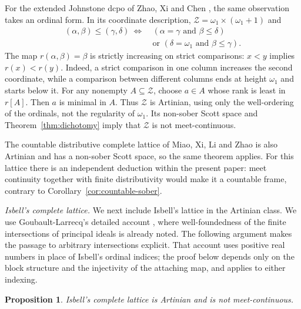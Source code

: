 \documentclass[11pt,reqno]{amsart}
\newtheorem{proposition}[theorem]{Proposition}
\theoremstyle{definition}
\numberwithin{equation}{section}
\begin{document}
For the extended Johnstone dcpo of Zhao, Xi and Chen
\citep{ZhaoXiChen2019}, the same observation takes an ordinal form.
In its coordinate description,
$\mathcal Z=\omega_1\times(\omega_1+1)$ and
\begin{equation}\label{eq:extended-johnstone-order}
\begin{split}
  (\alpha,\beta)\leq(\gamma,\delta)
  ~\Longleftrightarrow~
  &(\alpha=\gamma\text{ and }\beta\leq\delta)\\
  &\text{or }(\delta=\omega_1\text{ and }\beta\leq\gamma).
\end{split}
\end{equation}
The map $r(\alpha,\beta)=\beta$ is strictly increasing on strict
comparisons: $x<y$ implies $r(x)<r(y)$. Indeed, a strict comparison in
one column increases the second coordinate, while a comparison between
different columns ends at height $\omega_1$ and starts below it.
For any nonempty $A\subseteq\mathcal Z$, choose $a\in A$ whose rank is
least in $r[A]$. Then $a$ is minimal in $A$. Thus $\mathcal Z$ is
Artinian, using only the well-ordering of the ordinals, not the
regularity of $\omega_1$. Its non-sober Scott space and
Theorem~\ref{thm:dichotomy} imply that $\mathcal Z$ is not meet-continuous.

The countable distributive complete lattice of Miao, Xi, Li and Zhao
\citep{MiaoXiLiZhao2023} is also Artinian and has a non-sober Scott
space, so the same theorem applies. For this lattice there is an
independent deduction within the present paper: meet continuity together
with finite distributivity would make it a countable frame, contrary to
Corollary~\ref{cor:countable-sober}.

\emph{Isbell's complete lattice.}
We next include Isbell's lattice \citep{Isbell1982} in the Artinian
class. We use Goubault-Larrecq's detailed account
\citep{GoubaultLarrecqIsbell}, where well-foundedness of the finite
intersections of principal ideals is already noted. The following
argument makes the passage to arbitrary intersections explicit. That
account uses positive real numbers in place of Isbell's ordinal indices;
the proof below depends only on the block structure and the injectivity
of the attaching map, and applies to either indexing.

\begin{proposition}\label{prop:isbell-artinian}
Isbell's complete lattice is Artinian and is not meet-continuous.
\end{proposition}
\end{document}
